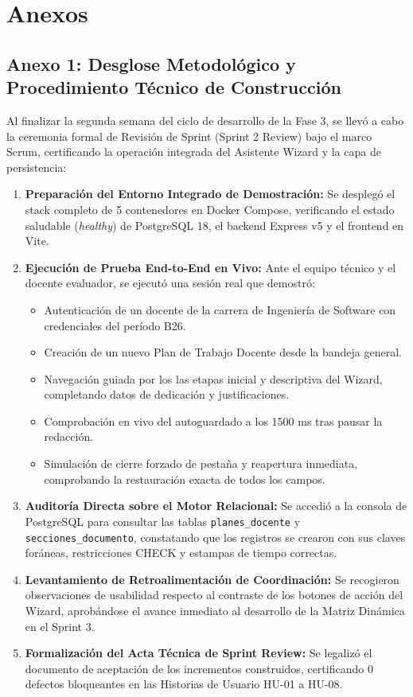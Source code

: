 \documentclass[12pt,a4paper]{article}
\begin{document}
\vspace{0.4cm}

\section{Anexos}

\subsection*{Anexo 1: Desglose Metodológico y Procedimiento Técnico de Construcción}
Al finalizar la segunda semana del ciclo de desarrollo de la Fase 3, se llevó a cabo la ceremonia formal de Revisión de Sprint (Sprint 2 Review) bajo el marco Scrum, certificando la operación integrada del Asistente Wizard y la capa de persistencia:

\begin{enumerate}[leftmargin=1.5em, itemsep=3pt]
    \item \textbf{Preparación del Entorno Integrado de Demostración:} Se desplegó el stack completo de 5 contenedores en Docker Compose, verificando el estado saludable (\textit{healthy}) de PostgreSQL 18, el backend Express v5 y el frontend en Vite.
    \item \textbf{Ejecución de Prueba End-to-End en Vivo:} Ante el equipo técnico y el docente evaluador, se ejecutó una sesión real que demostró:
    \begin{itemize}[leftmargin=1.2em, itemsep=2pt]
        \item Autenticación de un docente de la carrera de Ingeniería de Software con credenciales del período B26.
        \item Creación de un nuevo Plan de Trabajo Docente desde la bandeja general.
        \item Navegación guiada por los las etapas inicial y descriptiva del Wizard, completando datos de dedicación y justificaciones.
        \item Comprobación en vivo del autoguardado a los 1500 ms tras pausar la redacción.
        \item Simulación de cierre forzado de pestaña y reapertura inmediata, comprobando la restauración exacta de todos los campos.
    \end{itemize}
    \item \textbf{Auditoría Directa sobre el Motor Relacional:} Se accedió a la consola de PostgreSQL para consultar las tablas \texttt{planes\_\allowbreak  docente} y \texttt{secciones\_\allowbreak  documento}, constatando que los registros se crearon con sus claves foráneas, restricciones CHECK y estampas de tiempo correctas.
    \item \textbf{Levantamiento de Retroalimentación de Coordinación:} Se recogieron observaciones de usabilidad respecto al contraste de los botones de acción del Wizard, aprobándose el avance inmediato al desarrollo de la Matriz Dinámica en el Sprint 3.
    \item \textbf{Formalización del Acta Técnica de Sprint Review:} Se legalizó el documento de aceptación de los incrementos construidos, certificando 0 defectos bloqueantes en las Historias de Usuario HU-01 a HU-08.
\end{enumerate}
\end{document}

